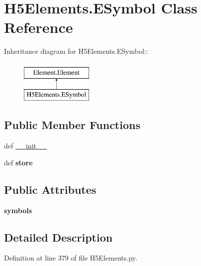 \hypertarget{classH5Elements_1_1ESymbol}{
\section{H5Elements.ESymbol Class Reference}
\label{classH5Elements_1_1ESymbol}
}
Inheritance diagram for H5Elements.ESymbol::\begin{figure}[H]
\begin{center}
\leavevmode
\includegraphics[height=2cm]{classH5Elements_1_1ESymbol}
\end{center}
\end{figure}
\subsection*{Public Member Functions}
\begin{DoxyCompactItemize}
\item 
def \hyperlink{classH5Elements_1_1ESymbol_ae29345c630720f8c56b66c6ab74c39be}{\_\-\_\-init\_\-\_\-}
\item 
\hypertarget{classH5Elements_1_1ESymbol_aef5a885ba867f51e723db359e41f6280}{
def {\bfseries store}}
\label{classH5Elements_1_1ESymbol_aef5a885ba867f51e723db359e41f6280}

\end{DoxyCompactItemize}
\subsection*{Public Attributes}
\begin{DoxyCompactItemize}
\item 
\hypertarget{classH5Elements_1_1ESymbol_aa12375c96285f20a725ff953a6d017b8}{
{\bfseries symbols}}
\label{classH5Elements_1_1ESymbol_aa12375c96285f20a725ff953a6d017b8}

\end{DoxyCompactItemize}


\subsection{Detailed Description}


Definition at line 379 of file H5Elements.py.

